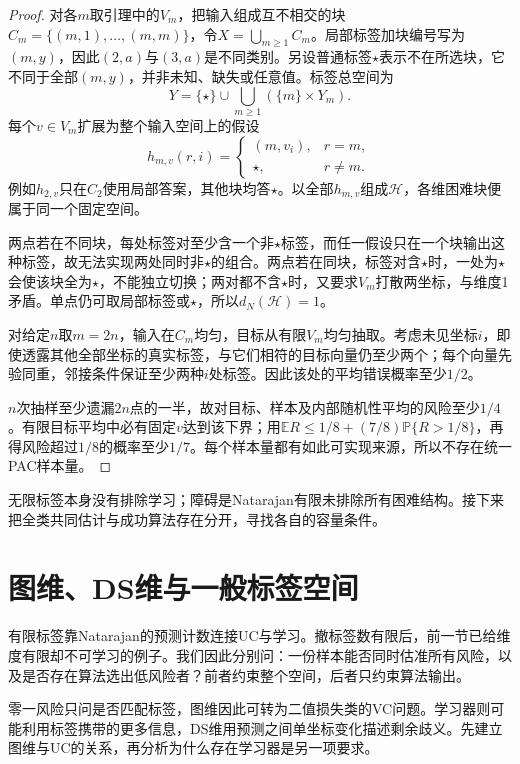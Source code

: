 \begin{proof}
对各$m$取引理中的$V_m$，把输入组成互不相交的块$C_m=\{(m,1),\ldots,(m,m)\}$，令$X=\bigcup_{m\geq1}C_m$。局部标签加块编号写为$(m,y)$，因此$(2,a)$与$(3,a)$是不同类别。另设普通标签$\star$表示不在所选块，它不同于全部$(m,y)$，并非未知、缺失或任意值。标签总空间为
\[
 Y=\{\star\}\cup\bigcup_{m\geq1}(\{m\}\times Y_m).
\]
每个$v\in V_m$扩展为整个输入空间上的假设
\[
 h_{m,v}(r,i)=
 \begin{cases}
 (m,v_i),&r=m,\\
 \star,&r\neq m.
 \end{cases}
\]
例如$h_{2,v}$只在$C_2$使用局部答案，其他块均答$\star$。以全部$h_{m,v}$组成$\mathcal H$，各维困难块便属于同一个固定空间。

两点若在不同块，每处标签对至少含一个非$\star$标签，而任一假设只在一个块输出这种标签，故无法实现两处同时非$\star$的组合。两点若在同块，标签对含$\star$时，一处为$\star$会使该块全为$\star$，不能独立切换；两对都不含$\star$时，又要求$V_m$打散两坐标，与维度1矛盾。单点仍可取局部标签或$\star$，所以$d_N(\mathcal H)=1$。

对给定$n$取$m=2n$，输入在$C_m$均匀，目标从有限$V_m$均匀抽取。考虑未见坐标$i$，即使透露其他全部坐标的真实标签，与它们相符的目标向量仍至少两个；每个向量先验同重，邻接条件保证至少两种$i$处标签。因此该处的平均错误概率至少$1/2$。

$n$次抽样至少遗漏$2n$点的一半，故对目标、样本及内部随机性平均的风险至少$1/4$。有限目标平均中必有固定$v$达到该下界；用$\mathbb E R\leq1/8+(7/8)\mathbb P\{R>1/8\}$，再得风险超过$1/8$的概率至少$1/7$。每个样本量都有如此可实现来源，所以不存在统一PAC样本量。
\end{proof}

无限标签本身没有排除学习；障碍是Natarajan有限未排除所有困难结构。接下来把全类共同估计与成功算法存在分开，寻找各自的容量条件。

\section{图维、DS维与一般标签空间}
\label{sec:general-multiclass-dimensions}
\label{sec:multiclass-sample-complexity}
有限标签靠Natarajan的预测计数连接UC与学习。撤标签数有限后，前一节已给维度有限却不可学习的例子。我们因此分别问：一份样本能否同时估准所有风险，以及是否存在算法选出低风险者？前者约束整个空间，后者只约束算法输出。

零一风险只问是否匹配标签，图维因此可转为二值损失类的VC问题。学习器则可能利用标签携带的更多信息，DS维用预测之间单坐标变化描述剩余歧义。先建立图维与UC的关系，再分析为什么存在学习器是另一项要求。


